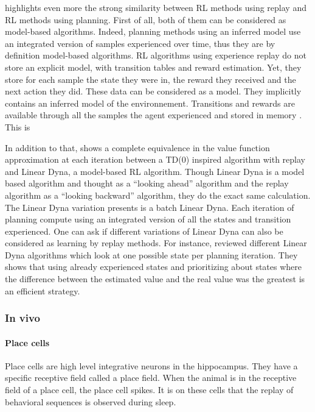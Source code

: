 \documentclass[]{article}
\begin{document}
\textcite{vanseijen_deeper_2015} highlights even more the strong similarity between RL methods using replay and RL methods using planning. First of all, both of them can be considered as model-based algorithms. Indeed, planning methods using an inferred model use an integrated version of samples experienced over time, thus they are by definition model-based algorithms.
RL algorithms using experience replay do not store an explicit model, with transition tables and reward estimation. Yet, they store for each sample the state they were in, the reward they received and the next action they did. These data can be considered as a model. They implicitly contains an inferred model of the environnement. Transitions and rewards are available through all the samples the agent experienced and stored in memory \parencite{vanseijen_deeper_2015}. This is


In addition to that, \textcite{vanseijen_deeper_2015} shows a complete equivalence in the value function approximation at each iteration between a TD(0) inspired algorithm with replay and Linear Dyna, a model-based RL algorithm. Though Linear Dyna is a model based algorithm and thought as a ``looking ahead'' algorithm and the replay algorithm as a ``looking backward'' algorithm, they do the exact same calculation.
The Linear Dyna variation \textcite{vanseijen_deeper_2015} presents is a batch Linear Dyna. Each iteration of planning compute using an integrated version of all the states and transition experienced. One can ask if different variations of Linear Dyna can also be considered as learning by replay methods. For instance, \textcite{sutton_dyna-style_2012} reviewed different Linear Dyna algorithms which look at one possible state per planning iteration. They shows that using already experienced states and prioritizing about states where the difference between the estimated value and the real value was the greatest is an efficient strategy.

\subsubsection{In vivo}
\label{sub:In vivo}

\paragraph{Place cells}\label{place-cells}
Place cells are high level integrative neurons in the hippocampus. They have a specific receptive field called a place field. When the animal is in the receptive field of a place cell, the place cell spikes. It is on these cells that the replay of behavioral sequences is observed during sleep.
\end{document}

